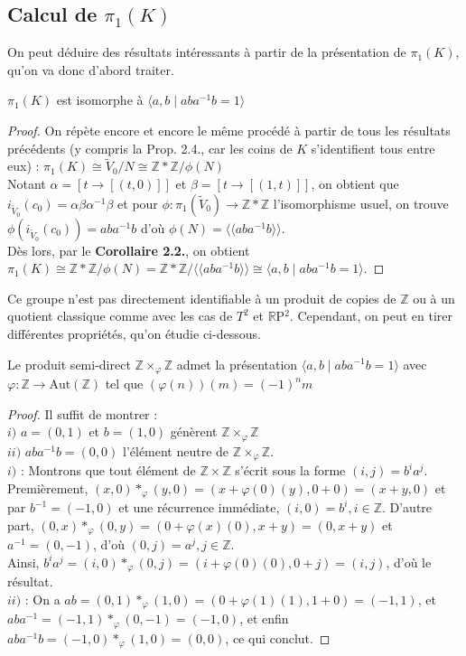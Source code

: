 \subsection{Calcul de $\pi_1(K)$}
On peut déduire des résultats intéressants à partir de la présentation de $\pi_1(K)$, qu'on va donc d'abord traiter.
\begin{proposition}
    $\pi_1(K)$ est isomorphe à $\langle a,b\mid aba^{-1}b=1\rangle$
\end{proposition}
\begin{proof}
    On répète encore et encore le même procédé à partir de tous les résultats précédents (y compris la Prop. 2.4., car les coins de $K$ s'identifient tous entre eux) : $\pi_1(K)\cong\tilde{V}_0/N\cong\mathbb{Z}*\mathbb{Z}/\phi(N)$\medskip\\
    Notant $\alpha=[t\to[(t,0)]]$ et $\beta=[t\to[(1,t)]]$, on obtient que $i_{\tilde{V}_0}(c_0)=\alpha\beta\alpha^{-1}\beta$ et pour $\phi:\pi_1(\tilde{V}_0)\to\mathbb{Z}*\mathbb{Z}$ l'isomorphisme usuel, on trouve $\phi(i_{\tilde{V}_0}(c_0))=aba^{-1}b$ d'où $\phi(N)=\langle\langle aba^{-1}b\rangle\rangle$.\medskip\\
    Dès lors, par le \textbf{Corollaire 2.2.}, on obtient $\pi_1(K)\cong\mathbb{Z}*\mathbb{Z}/\phi(N)=\mathbb{Z}*\mathbb{Z}/\langle\langle aba^{-1}b\rangle\rangle\cong\langle a,b\mid aba^{-1}b=1\rangle$.
\end{proof}
Ce groupe n'est pas directement identifiable à un produit de copies de $\mathbb{Z}$ ou à un quotient classique comme avec les cas de $T^2$ et $\mathbb{R}$P$^2$. Cependant, on peut en tirer différentes propriétés, qu'on étudie ci-dessous.
\begin{proposition}
    Le produit semi-direct $\mathbb{Z}\times_{\varphi}\mathbb{Z}$ admet la présentation $\langle a,b\mid aba^{-1}b=1\rangle$ avec\\ $\varphi:\mathbb{Z}\to\text{Aut}(\mathbb{Z})$ tel que $(\varphi(n))(m)=(-1)^nm$
\end{proposition}
\begin{proof}
    Il suffit de montrer  :\\
    $i)$ $a=(0,1)$ et $b=(1,0)$ génèrent $\mathbb{Z}\times_{\varphi}\mathbb{Z}$\\ $ii)$ $aba^{-1}b=(0,0)$ l'élément neutre de $\mathbb{Z}\times_{\varphi}\mathbb{Z}$.\medskip\\$i)$ : Montrons que tout élément de $\mathbb{Z}\times\mathbb{Z}$ s'écrit sous la forme $(i,j)=b^ia^j$. Premièrement, $(x,0)*_{\varphi}(y,0)=(x+\varphi(0)(y),0+0)=(x+y,0)$ et par $b^{-1}=(-1,0)$ et une récurrence immédiate, $(i,0)=b^i,i\in\mathbb{Z}$. D'autre part, $(0,x)*_{\varphi}(0,y)=(0+\varphi(x)(0),x+y)=(0,x+y)$ et $a^{-1}=(0,-1)$, d'où $(0,j)=a^j,j\in\mathbb{Z}$.\\
    Ainsi, $b^ia^j=(i,0)*_{\varphi}(0,j)=(i+\varphi(0)(0),0+j)=(i,j)$, d'où le résultat.\medskip\\
    $ii)$ : On a $ab=(0,1)*_{\varphi}(1,0)=(0+\varphi(1)(1),1+0)=(-1,1)$, et $aba^{-1}=(-1,1)*_{\varphi}(0,-1)=(-1,0)$, et enfin $aba^{-1}b=(-1,0)*_{\varphi}(1,0)=(0,0)$, ce qui conclut.
\end{proof}
